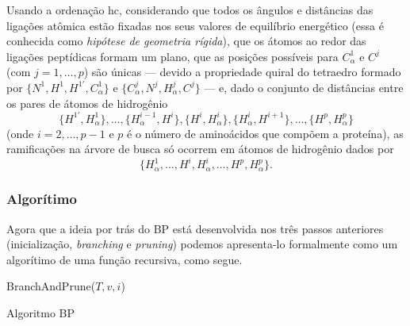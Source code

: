 \begin{teorema}
	Usando a ordenação hc, considerando que todos os ângulos e distâncias das ligações atômica estão fixadas nos seus valores de equilíbrio energético (essa é conhecida como \textit{hipótese de geometria rígida}), que os átomos ao redor das ligações peptídicas formam um plano, que as posições possíveis para $C_\alpha^1$ e $C^j$ (com $j = 1, \dots,p$) são únicas --- devido a propriedade quiral do tetraedro formado por $\{N^1, H^1, H^{1\prime}, C_\alpha^1\}$ e $\{C_\alpha^j, N^j, H^j_\alpha,C^j\}$ --- e, dado o conjunto de distâncias entre os pares de átomos de hidrogênio
	$$\{H^{1\prime}, H^1_\alpha\}, \dots, \{H_\alpha^{i-1}, H^i\}, \{H^i, H^i_\alpha\}, \{H^i_\alpha, H^{i+1}\}, \dots, \{H^p, H^p_\alpha\}$$
	(onde $i = 2, \dots, p-1$ e $p$ é o número de aminoácidos que compõem a proteína), as ramificações na árvore de busca só ocorrem em átomos de hidrogênio dados por
	$$\{H_\alpha^1, \dots, H^i, H_\alpha^i, \dots, H^p, H_\alpha^p\}.$$	
\end{teorema}

\subsubsection{Algorítimo}
Agora que a ideia por trás do BP está desenvolvida nos três passos anteriores (inicialização, \textit{branching} e \textit{pruning}) podemos apresenta-lo formalmente como um algorítimo de uma função recursiva, como segue.
\\

\begin{algorithm}[H]
	BranchAndPrune($T,v,i$)\\
	\caption{Algoritmo BP \cite{fidalgotese} \cite{carlile:BP}}
\end{algorithm}